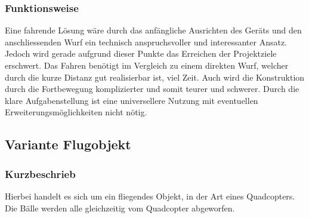 \subsubsection{Funktionsweise}
Eine fahrende Lösung wäre durch das anfängliche Ausrichten des Geräts und 
den anschliessenden Wurf ein technisch anspruchsvoller und interessanter 
Ansatz. Jedoch wird gerade aufgrund dieser Punkte das Erreichen der 
Projektziele erschwert. Das Fahren benötigt im Vergleich zu einem direkten 
Wurf, welcher durch die kurze Distanz gut realisierbar ist, viel Zeit. Auch 
wird die Konstruktion durch die Fortbewegung komplizierter und somit 
teurer und schwerer. Durch die klare Aufgabenstellung ist eine 
universellere Nutzung mit eventuellen Erweiterungsmöglichkeiten nicht nötig. 



\clearpage

\subsection{Variante Flugobjekt}
\subsubsection{Kurzbeschrieb}
Hierbei handelt es sich um ein fliegendes Objekt, in der Art eines Quadcopters. Die Bälle werden alle gleichzeitig vom Quadcopter abgeworfen.

